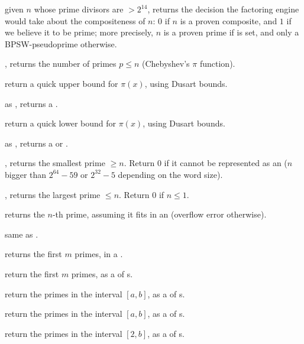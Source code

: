  given $n$ whose prime divisors are $> 2^{14}$,
returns the decision the factoring engine would take about the compositeness
of $n$: $0$ if $n$ is a proven composite, and $1$ if we believe it to be
prime; more precisely, $n$ is a proven prime if  is
set, and only a BPSW-pseudoprime otherwise.



, returns the number of primes $p\leq n$
(Chebyshev's $\pi$ function).

 return a quick upper bound for
$\pi(x)$, using Dusart bounds.

 as , returns a
.

 return a quick lower bound for
$\pi(x)$, using Dusart bounds.

 as , returns
a  or .


, returns the smallest prime $\geq n$. Return
$0$ if it cannot be represented as an  ($n$ bigger than $2^{64} -
59$ or $2^{32} - 5$ depending on the word size).

, returns the largest prime $\leq n$. Return
$0$ if $n\leq 1$.

 returns the $n$-th prime, assuming it fits in an
 (overflow error otherwise).

 same as .

 returns the first $m$ primes, in a
.

 return the first $m$ primes, as a  of
s.

 return the primes in the interval
$[a,b]$, as a  of s.

 return the primes in the
interval $[a,b]$, as a  of s.

 return the primes in the interval $[2,b]$,
as a  of s.

